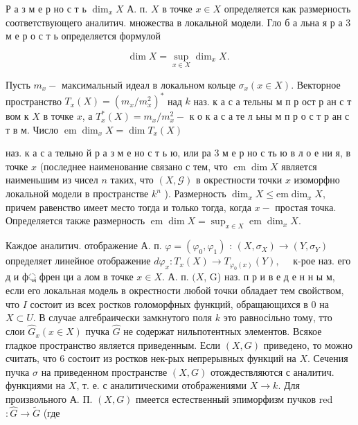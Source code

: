 \documentclass[10pt]{article}
\begin{document}
Р а з м е р но с т ь $\operatorname{dim}_{x} X$ А. п. $X$ в точке $x \in X$ определяется как размерность соответствующего аналитич. множества в локальной модели. Гло б а льна я р а 3 м е р о с т ь определяется формулой



\[

\operatorname{dim} X=\sup _{x \in X} \operatorname{dim}_{x} X \text {. }

\]



Пусть $m_{x}-$ максимальный идеал в локальном кольце $\sigma_{x}(x \in X)$. Векторное пространство $T_{x}(X)=\left(m_{x} / m_{x}^{2}\right)^{*}$ над $k$ наз. к а с а тельны м п р ост р ан с т вом к $X$ в точке $x$, а $T_{x}^{*}(X)=m_{x} / m_{x}^{2}-$ к о к а с а те л ьны м п р о с т р ан с т в м. Число $\operatorname{em} \operatorname{dim}_{x} X=\operatorname{dim} T_{x}(X)$



наз. к а с а тельно й р а з м е но с т ь ю, или ра 3 м е р но с ть ю в л о е ни я, в точке $x$ (последнее наименование связано с тем, что $\operatorname{em} \operatorname{dim} X$ является наименьшим из чисел $n$ таких, что $(X, \mathcal{G})$ в окрестности точки $x$ изоморфно локальной модели в пространстве $k^{n}$ ). Размерность $\operatorname{dim}_{x} X \leqslant \mathrm{em} \operatorname{dim}_{x} X$, причем равенство имеет место тогда и только тогда, когда $x-$ простая точка. Определяется также размерность $\operatorname{em} \operatorname{dim} X=\sup _{x \in X} \operatorname{em} \operatorname{dim}_{x} X$.



Каждое аналитич. отображение А. п. $\varphi=\left(\varphi_{0}, \varphi_{1}\right)$ : $\left(X, \sigma_{X}\right) \rightarrow\left(Y, \sigma_{Y}\right)$ определяет линейное отображение $d \varphi_{x}: T_{x}(X) \rightarrow T_{\varphi_{0}(x)}(Y), \quad$ к-рое наз. его д и ф্র френ ци а лом в точке $x \in X$. А. п. $(X$, G) наз. п р и в е д е н н ы м, если его локальная модель в окрестности любой точки обладает тем свойством, что $I$ состоит из всех ростков голоморфных функций, обращающихся в 0 на $X \subset U$. В случае алгебраически замкнутого поля $k$ это равносільно тому, тто слои $\widehat{G}_{x}(x \in X)$ пучка $\widehat{G}$ не содержат нильпотентных элементов. Всякое гладкое пространство является приведенным. Если $(X, G)$ приведено, то можно считать, что 6 состоит из ростков нек-рых непрерывных функций на $X$. Сечения пучка $\sigma$ на приведенном пространстве $(X, G)$ отождествляются с аналитич. функциями на $X$, т. е. с аналитическими отображениями $X \rightarrow k$. Для произвольного А. П. $(X, G)$ пмеется естественный эпиморфизм пучков red $: \widehat{G} \rightarrow \widetilde{G}$ (где
\end{document}
